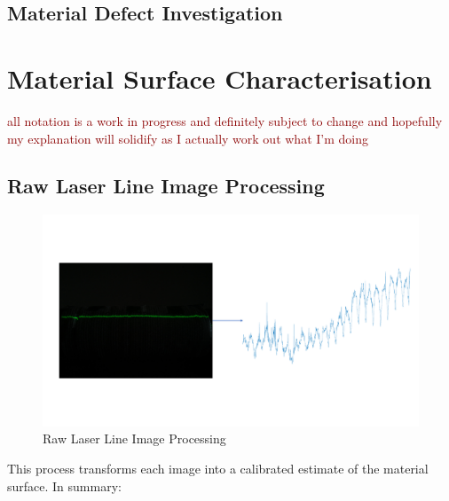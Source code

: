 \documentclass[12pt]{report}
\newcommand{\tcr}[1]{\textcolor{darkRed}{#1}}
\begin{document}
        \subsection{}
    \section{Material Defect Investigation}
\chapter{Material Surface Characterisation}
    \tcr{all notation is a work in progress and definitely subject to change and hopefully my explanation will solidify as I actually work out what I'm doing}
    \section{Raw Laser Line Image Processing}
        \begin{figure}[ht!]
            \centering
            \includegraphics[width=\textwidth,trim={0 5cm 0 5cm},clip]{temp_height_measure.pdf}
            \caption{Raw Laser Line Image Processing}
        \end{figure}
        This process transforms each image into a calibrated estimate of the material surface. In summary:
        
\end{document}
